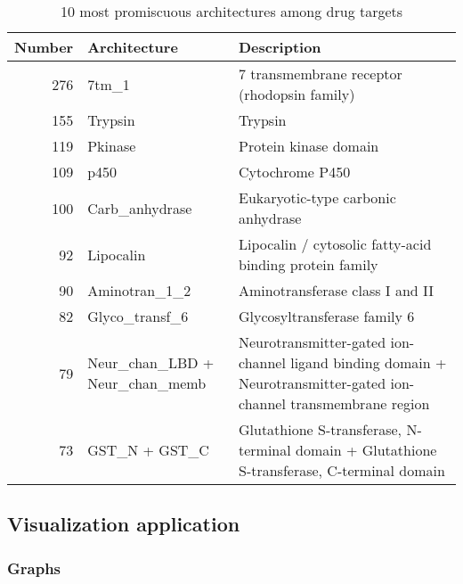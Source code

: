  \begin{table}
	\begin{center}
		\sf
		\begin{tabular}{r p{} p{}}
			\textbf{Number} & \textbf{Architecture} & \textbf{Description} \\
			\hline
			 276  & 7tm\_1          & 7 transmembrane receptor (rhodopsin family)             \\
			 155  & Trypsin        & Trypsin                                                 \\
			 119  & Pkinase        & Protein kinase domain                                   \\
			 109  & p450           & Cytochrome P450                                         \\
			 100  & Carb\_anhydrase & Eukaryotic-type carbonic anhydrase                      \\
			 92   & Lipocalin      & Lipocalin / cytosolic fatty-acid binding protein family \\
			 90   & Aminotran\_1\_2  & Aminotransferase class I and II                         \\
			 82   & Glyco\_transf\_6 & Glycosyltransferase family 6                            \\
			 79   & Neur\_chan\_LBD + \newline Neur\_chan\_memb & Neurotransmitter-gated ion-channel ligand binding domain + \newline Neurotransmitter-gated ion-channel transmembrane region                                                  \\
			 73   & GST\_N + GST\_C & Glutathione S-transferase, N-terminal domain + \newline Glutathione S-transferase, C-terminal domain                                                  \\
			\hline
		\end{tabular}
		\caption{10 most promiscuous architectures among drug targets}
	\end{center}
\end{table}


\subsection{Visualization application}

\subsubsection{Graphs}

